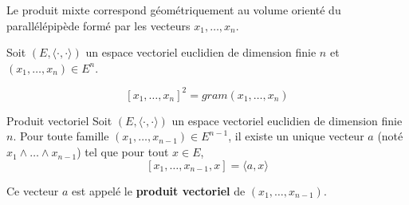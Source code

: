 \documentclass[a4paper, 12pt]{article}
\begin{document}
\begin{remarque}
    Le produit mixte correspond géométriquement au volume orienté du parallélépipède formé par les vecteurs $x_1, \dots, x_n$.
\end{remarque}

\begin{proposition}{}{}
    Soit $(E, \langle \cdot, \cdot \rangle)$ un espace vectoriel euclidien de dimension finie $n$ et $(x_1, \dots, x_n) \in E^n$.

    $$
    [x_1, \dots, x_n]^2 = gram(x_1, \dots, x_n)
    $$
\end{proposition}

\begin{theoreme}{Produit vectoriel}{}
    Soit $(E, \langle \cdot, \cdot \rangle)$ un espace vectoriel euclidien de dimension finie $n$.
    Pour toute famille $(x_1, \dots, x_{n-1}) \in E^{n-1}$, il existe un unique vecteur $a$ (noté $x_1 \wedge \dots \wedge x_{n-1}$) tel que pour tout $x \in E$,
    $$
    [x_1, \dots, x_{n-1}, x] = \langle a, x \rangle
    $$

    Ce vecteur $a$ est appelé le \textbf{produit vectoriel} de $(x_1, \dots, x_{n-1})$.
\end{theoreme}
\end{document}
